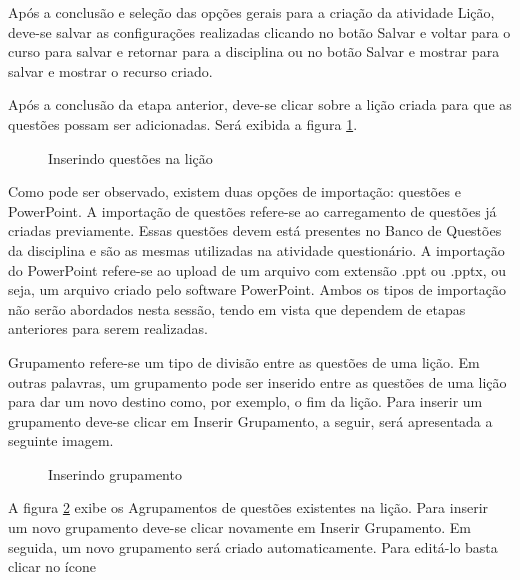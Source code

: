 Após a conclusão e seleção das opções gerais para a criação da atividade Lição, deve-se salvar as configurações realizadas clicando no botão Salvar e voltar para o curso para salvar e retornar para a disciplina ou no botão Salvar e mostrar para salvar e mostrar o recurso criado.

Após a conclusão da etapa anterior, deve-se clicar sobre a lição criada para que as questões possam ser adicionadas. Será exibida a figura \ref{fig:inserindo_quest}.

\begin{figure}
 \begin{center}
  \caption{Inserindo questões na lição}
  \label{fig:inserindo_quest}
 \end{center}
\end{figure}

Como pode ser observado, existem duas opções de importação: questões e PowerPoint. A importação de questões refere-se ao carregamento de questões já criadas previamente. Essas questões devem está presentes no Banco de Questões da disciplina e são as mesmas utilizadas na atividade questionário. A importação do PowerPoint refere-se ao upload de um arquivo com extensão .ppt ou .pptx, ou seja, um arquivo criado pelo software PowerPoint. Ambos os tipos de importação não serão abordados nesta sessão, tendo em vista que dependem de etapas anteriores para serem realizadas.

Grupamento refere-se um tipo de divisão entre as questões de uma lição. Em outras palavras, um grupamento pode ser inserido entre as questões de uma lição para dar um novo destino como, por exemplo, o fim da lição. Para inserir um grupamento deve-se clicar em Inserir Grupamento, a seguir, será apresentada a seguinte imagem.

\begin{figure}
 \begin{center}
  \caption{Inserindo grupamento}
  \label{fig:inserindo_grup}
 \end{center}
\end{figure}

A figura \ref{fig:inserindo_grup} exibe os Agrupamentos de questões existentes na lição. Para inserir um novo grupamento deve-se clicar novamente em Inserir Grupamento. Em seguida, um novo grupamento será criado automaticamente. Para editá-lo basta clicar no ícone
